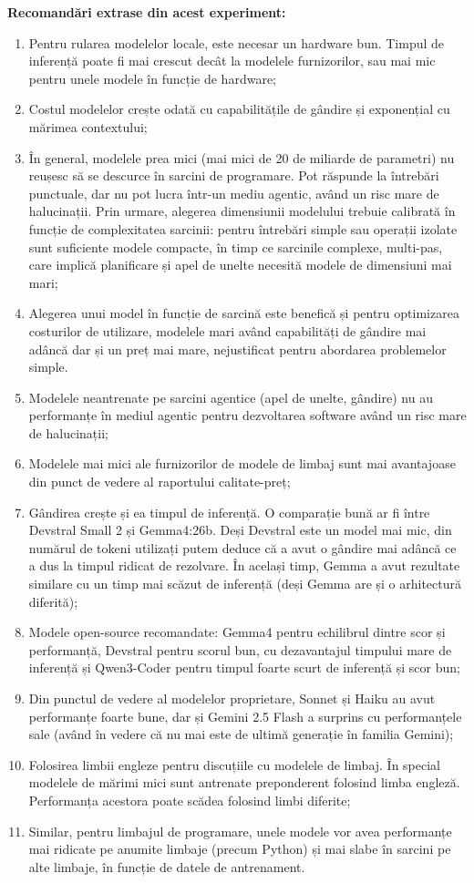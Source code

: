 \documentclass[12pt, a4paper, oneside, romanian]{teza-upb}
\begin{document}
  \textbf{Recomandări extrase din acest experiment:}
  \begin{enumerate}
    \item Pentru rularea modelelor locale, este necesar un hardware bun. Timpul de inferență poate fi mai crescut decât la modelele furnizorilor, sau mai mic pentru unele modele în funcție de hardware;
    \item Costul modelelor crește odată cu capabilitățile de gândire și exponențial cu mărimea contextului;
    \item În general, modelele prea mici (mai mici de 20 de miliarde de parametri) nu reușesc să se descurce în sarcini de programare. Pot răspunde la întrebări punctuale, dar nu pot lucra într-un mediu agentic, având un risc mare de halucinații. Prin urmare, alegerea dimensiunii modelului trebuie calibrată în funcție de complexitatea sarcinii: pentru întrebări simple sau operații izolate sunt suficiente modele compacte, în timp ce sarcinile complexe, multi-pas, care implică planificare și apel de unelte necesită modele de dimensiuni mai mari; 
    \item Alegerea unui model în funcție de sarcină este benefică și pentru optimizarea costurilor de utilizare, modelele mari având capabilități de gândire mai adâncă dar și un preț mai mare, nejustificat pentru abordarea problemelor simple.
    \item Modelele neantrenate pe sarcini agentice (apel de unelte, gândire) nu au performanțe în mediul agentic pentru dezvoltarea software având un risc mare de halucinații;
    \item Modelele mai mici ale furnizorilor de modele de limbaj sunt mai avantajoase din punct de vedere al raportului calitate-preț;
    \item Gândirea crește și ea timpul de inferență. O comparație bună ar fi între Devstral Small 2 și Gemma4:26b. Deși Devstral este un model mai mic, din numărul de tokeni utilizați putem deduce
    că a avut o gândire mai adâncă ce a dus la timpul ridicat de rezolvare. În același timp, Gemma a avut rezultate similare cu un timp mai scăzut de inferență (deși Gemma are și o arhitectură diferită);
    \item Modele open-source recomandate: Gemma4 pentru echilibrul dintre scor și performanță, Devstral pentru scorul bun, cu dezavantajul timpului mare de inferență și Qwen3-Coder pentru timpul foarte scurt de inferență și scor bun;
    \item Din punctul de vedere al modelelor proprietare, Sonnet și Haiku au avut performanțe foarte bune, dar și Gemini 2.5 Flash a surprins cu performanțele sale (având în vedere că nu mai este de ultimă generație
    în familia Gemini);
    \item Folosirea limbii engleze pentru discuțiile cu modelele de limbaj. În special modelele de mărimi mici sunt antrenate preponderent folosind limba engleză. Performanța acestora poate scădea folosind limbi diferite;
    \item Similar, pentru limbajul de programare, unele modele vor avea performanțe mai ridicate pe anumite limbaje (precum Python) și mai slabe în sarcini pe alte limbaje, în funcție de datele de antrenament. 
  \end{enumerate}
\end{document}
